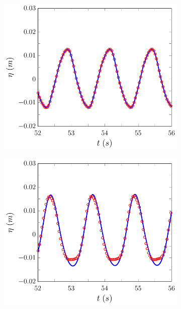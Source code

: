 \begin{figure}
	\centering
	\begin{subfigure}{0.5\textwidth}
		\includegraphics[width=\textwidth]{./chp6/figures/Experiment/Beji/sh/FEVMWG1.pdf}
		\vspace{0.5cm}
	\end{subfigure}%
	\begin{subfigure}{0.5\textwidth}
		\includegraphics[width=\textwidth]{./chp6/figures/Experiment/Beji/sh/FEVMWG2.pdf}

\end{subfigure}
\end{figure}
